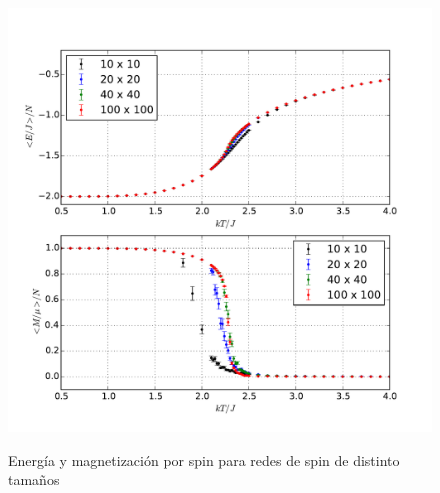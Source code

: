 \documentclass[a4paper,12pt]{article}
\begin{document}
\begin{figure}[H]
    \begin{center}
      \includegraphics[scale=0.7]{tamano_val_medios.pdf} \\
      \caption{Energía y magnetización por spin para redes de spin de distinto 
      tamaños}\label{fig:tam_val_medios}
    \end{center}
\end{figure}
\end{document}
